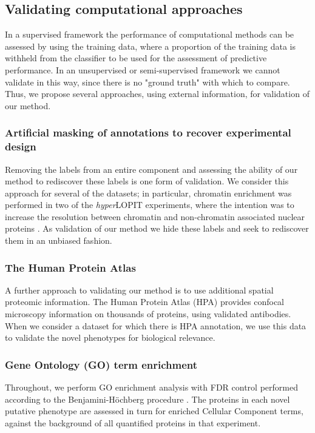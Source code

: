 \documentclass[12pt,english]{article}
\begin{document}
\subsection*{Validating computational approaches}
In a supervised framework the performance of computational methods can be assessed by 
using the training data, where a proportion of the training data is withheld from the classifier to be used for the assessment of predictive performance. In an unsupervised or semi-supervised framework we cannot validate in this way, since there is no "ground truth" with which to compare. Thus, we propose several approaches, using external information, for validation of our method.
\subsubsection*{Artificial masking of annotations to recover experimental design}
Removing the labels from an entire component and assessing the ability of our method to rediscover these labels is one form of validation. We consider this approach for several of the datasets; in particular, chromatin enrichment was performed in two of the \textit{hyper}LOPIT experiments, where the intention was to increase the resolution between chromatin and non-chromatin associated nuclear proteins \citep{hyper, Mulvey:2017, Thul:2017}. As validation of our method we hide these labels and seek to rediscover them in an unbiased fashion.
\subsubsection*{The Human Protein Atlas}
A further approach to validating our method is to use additional spatial proteomic information. The Human Protein Atlas (HPA) \citep{Thul:2017, Sullivan:2018} provides confocal microscopy information on thousands of proteins, using validated antibodies. When we consider a dataset for which there is HPA annotation, we use this data to validate the novel phenotypes for biological relevance. 
\subsubsection*{Gene Ontology (GO) term enrichment}
Throughout, we perform GO enrichment analysis with FDR control performed according to the Benjamini-H\"ochberg procedure \citep{FDR:1995,Ashburner:2000,Yu:2012}. The proteins in each novel putative phenotype are assessed in turn for enriched Cellular Component terms, against the background of all quantified proteins in that experiment.
\end{document}
